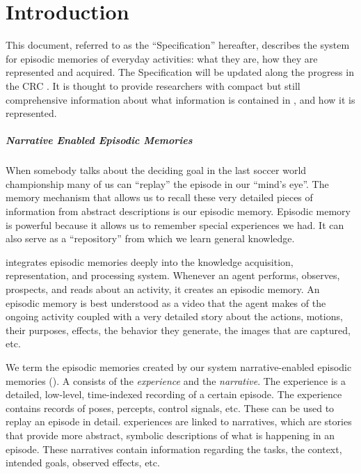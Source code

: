 \chapter{Introduction}

This document, referred to as the ``\neem Specification'' hereafter,
describes the \ease system for episodic memories of everyday activities:
what they are, how they are represented and acquired.
The \neem Specification will be updated along the progress in the CRC \ease.
It is thought to provide \ease researchers with compact but still comprehensive
information about what information is contained in \neems, and how it is represented.

\paragraph{Narrative Enabled Episodic Memories}
When somebody talks about the deciding goal in the
last soccer world championship many of us can ``replay'' the episode in our ``mind's eye''.
The memory mechanism that allows us to recall these very detailed pieces of
information from abstract descriptions is our episodic memory.
Episodic memory is powerful because it allows us to remember special
experiences we had. It can also serve as a ``repository'' from which we learn general knowledge.

\ease integrates episodic memories deeply into the knowledge acquisition, representation, and processing
system. Whenever an agent performs, observes, prospects, and
reads about an activity, it creates an episodic memory. An episodic
memory is best understood as a video that the agent makes of the
ongoing activity coupled with a very detailed story about the actions, motions, their purposes, effects,
the behavior they generate, the images that are captured, etc.

We term the episodic memories created by our system narrative-enabled episodic memories (\neems).
A \neem consists of the \emph{\neem experience} and the \emph{\neem narrative}.
The \neem experience is a detailed, low-level, time-indexed recording
of a certain episode. The experience contains records of poses, percepts, control signals, etc.
These can be used to replay an episode in detail.
\neem experiences are linked to \neem narratives, which are stories
that provide more abstract, symbolic descriptions of what is happening in an episode.
These narratives contain information regarding the tasks, the context, intended goals, observed effects, etc.

